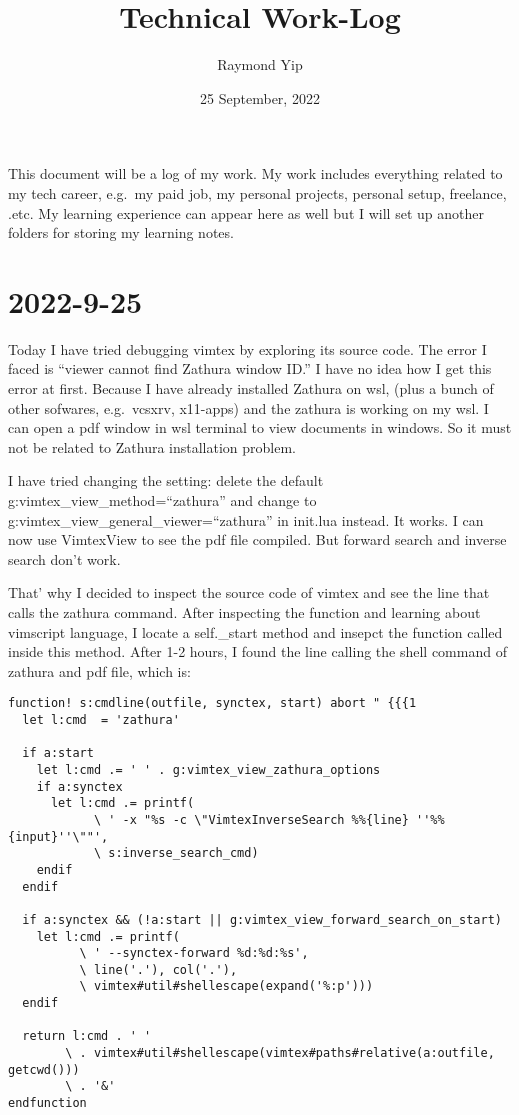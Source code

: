 \documentclass{article}
\title{Technical Work-Log}
\author{Raymond Yip}
\date{25 September, 2022}
\begin{document}
\maketitle

This document will be a log of my work. My work includes everything
related to my tech career, e.g.~my paid job, my personal projects,
personal setup, freelance, .etc. My learning experience can appear here
as well but I will set up another folders for storing my learning notes.

\section*{2022-9-25}

Today I have tried debugging vimtex by exploring its source code. The
error I faced is ``viewer cannot find Zathura window ID.'' I have no
idea how I get this error at first. Because I have already installed
Zathura on wsl, (plus a bunch of other sofwares, e.g.~vcsxrv, x11-apps)
and the zathura is working on my wsl. I can open a pdf window in wsl
terminal to view documents in windows. So it must not be related to
Zathura installation problem.

I have tried changing the setting: delete the default
g:vimtex\_view\_method=``zathura'' and change to
g:vimtex\_view\_general\_viewer=``zathura'' in init.lua instead. It
works. I can now use VimtexView to see the pdf file compiled. But
forward search and inverse search don't work.

That' why I decided to inspect the source code of vimtex and see the
line that calls the zathura command. After inspecting the function and
learning about vimscript language, I locate a self.\_start method and
insepct the function called inside this method. After 1-2 hours, I found
the line calling the shell command of zathura and pdf file, which is:

\begin{verbatim}
function! s:cmdline(outfile, synctex, start) abort " {{{1
  let l:cmd  = 'zathura'

  if a:start
    let l:cmd .= ' ' . g:vimtex_view_zathura_options
    if a:synctex
      let l:cmd .= printf(
            \ ' -x "%s -c \"VimtexInverseSearch %%{line} ''%%{input}''\""',
            \ s:inverse_search_cmd)
    endif
  endif

  if a:synctex && (!a:start || g:vimtex_view_forward_search_on_start)
    let l:cmd .= printf(
          \ ' --synctex-forward %d:%d:%s',
          \ line('.'), col('.'),
          \ vimtex#util#shellescape(expand('%:p')))
  endif

  return l:cmd . ' '
        \ . vimtex#util#shellescape(vimtex#paths#relative(a:outfile, getcwd()))
        \ . '&'
endfunction 
\end{verbatim}
\end{document}
